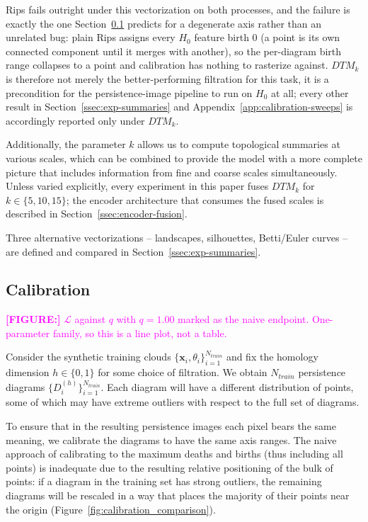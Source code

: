 \documentclass[11pt,letterpaper]{article}
\newcommand{\1}{\mathds{1}}
\newcommand{\pc}{\mathbf{x}}
\newcommand{\fig}[1]{\textcolor{magenta}{\textbf{[FIGURE:] }#1}}
\theoremstyle{plain}
\theoremstyle{definitioncolon}
\begin{document}
Rips fails outright under this vectorization on both processes, and the
failure is exactly the one Section~\ref{ssec:calibration} predicts for a
degenerate axis rather than an unrelated bug: plain Rips assigns every $H_0$
feature birth $0$ (a point is its own connected component until it merges
with another), so the per-diagram birth range collapses to a point and
calibration has nothing to rasterize against. $DTM_k$ is therefore not
merely the better-performing filtration for this task, it is a precondition
for the persistence-image pipeline to run on $H_0$ at all; every other
result in Section~\ref{ssec:exp-summaries} and
Appendix~\ref{app:calibration-sweeps} is accordingly reported only under
$DTM_k$.

Additionally, the parameter $k$ allows us to compute topological summaries at various scales,
which can be combined to provide the model with a more complete picture that includes information from
fine and coarse scales simultaneously. Unless varied explicitly, every
experiment in this paper fuses $DTM_k$ for $k \in \{5, 10, 15\}$; the encoder architecture
that consumes the fused scales is described in Section~\ref{ssec:encoder-fusion}.

Three alternative vectorizations -- landscapes, silhouettes, Betti/Euler curves -- are defined and compared in
Section~\ref{ssec:exp-summaries}.

\subsection{Calibration}
\label{ssec:calibration}

\fig{$\mathcal{L}$ against $q$ with $q=1.00$ marked as the naive endpoint.
One-parameter family, so this is a line plot, not a table.}

Consider the synthetic training clouds $\{\pc_i, \theta_i\}_{i=1}^{N_{train}}$
and fix the homology dimension $h \in \{0,1\}$ for some choice of filtration. We
obtain $N_{train}$ persistence diagrams $\{D^{(h)}_i\}_{i=1}^{N_{train}}$. Each
diagram will have a different distribution of points, some of which may have
extreme outliers with respect to the full set of diagrams.

To ensure that in the resulting persistence images each pixel bears the
same meaning, we calibrate the diagrams to have the same axis ranges. The
naive approach of calibrating to the maximum deaths and births (thus including all
points) is inadequate due to the resulting relative positioning of the
bulk of points: if a diagram in the training set has strong outliers, the remaining diagrams
will be rescaled in a way that places the majority of their points near the origin
(Figure~\ref{fig:calibration_comparison}).
\end{document}
